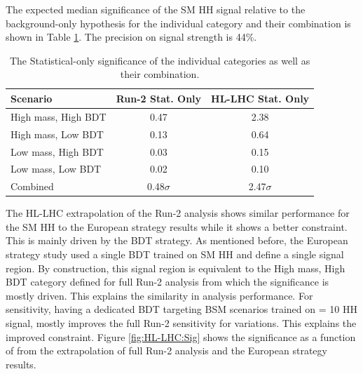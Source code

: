 The expected median significance of the SM HH signal relative to the background-only hypothesis for the individual category and their combination is shown in Table \ref{tab:HL-LHC:Sig}. The precision on signal strength is 44\%.

\begin{table}[htbp]
    \centering
    \begin{tabular}{lcc}
    \hline\hline 
        Scenario & Run-2 Stat. Only & HL-LHC Stat. Only \\
    \hline    
        High mass, High BDT & 0.47 & 2.38 \\
        High mass, Low BDT  & 0.13 & 0.64 \\
        Low mass, High BDT  & 0.03 & 0.15 \\
        Low mass, Low BDT   & 0.02 & 0.10 \\
        \hline
        Combined & 0.48$\sigma$ & 2.47$\sigma$ \\
    \hline\hline 
    \end{tabular}
    \begin{tcolorbox}[colback=black!5!white, colframe=white!75!black]
    \caption{The Statistical-only significance of the individual categories as well as their combination.}
    \label{tab:HL-LHC:Sig}
    \end{tcolorbox}
\end{table}


The HL-LHC extrapolation of the Run-2 analysis shows similar performance for the SM HH to the European strategy results while it shows a better \kl constraint. This is mainly driven by the BDT strategy. As mentioned before, the European strategy study used a single BDT trained on SM HH and define a single signal region. By construction, this signal region is equivalent to the High mass, High BDT category defined for full Run-2 analysis from which the significance is mostly driven. This explains the similarity in analysis performance. For \kl sensitivity, having a dedicated BDT targeting BSM scenarios trained on \kl = 10 HH signal, mostly improves the full Run-2 sensitivity for \kl variations. This explains the improved \kl constraint. Figure \ref{fig:HL-LHC:Sig} shows the significance as a function of \kl from the extrapolation of full Run-2 analysis and the European strategy results. \\

